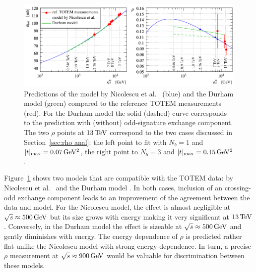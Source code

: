 \begin{figure}
\vskip-5mm
\begin{center}
\includegraphics{fig/matching_models_si_tot_rho.pdf}
\caption{%
Predictions of the model by Nicolescu et al.~\cite{nicolescu-2017} (blue) and the Durham model \cite{durham-2017-note} (green) compared to the reference TOTEM measurements (red). For the Durham model the solid (dashed) curve corresponds to the prediction with (without) odd-signature exchange component. The two $\rho$ points at $13\,{\rm TeV}$ correspond to the two cases discussed in Section~\ref{sec:rho anal}: the left point to fit with $N_b=1$ and $|t|_{\rm max} = 0.07\,{\rm GeV^2}$, the right point to $N_b=3$ and $|t|_{\rm max} = 0.15\,{\rm GeV^2}$.
}
\label{fig:match models}
\end{center}
\end{figure}

Figure~\ref{fig:match models} shows two models that are compatible with the TOTEM data: by Nicolescu et al.~\cite{nicolescu-2017} and the Durham model \cite{durham-2017-note}. In both cases, inclusion of an crossing-odd exchange component leads to an improvement of the agreement between the data and model. For the Nicolescu model, the effect is almost negligible at $\sqrt s \approx 500\,{\rm GeV}$ but its size grows with energy making it very significant at $13\,{\rm TeV}$. Conversely, in the Durham model the effect is sizeable at $\sqrt s \approx 500\,{\rm GeV}$ and gently diminishes with energy. The energy dependence of $\rho$ is predicted rather flat unlike the Nicolescu model with strong energy-dependence. In turn, a precise $\rho$ measurement at $\sqrt s \approx 900\,{\rm GeV}$ would be valuable for discrimination between these models.

